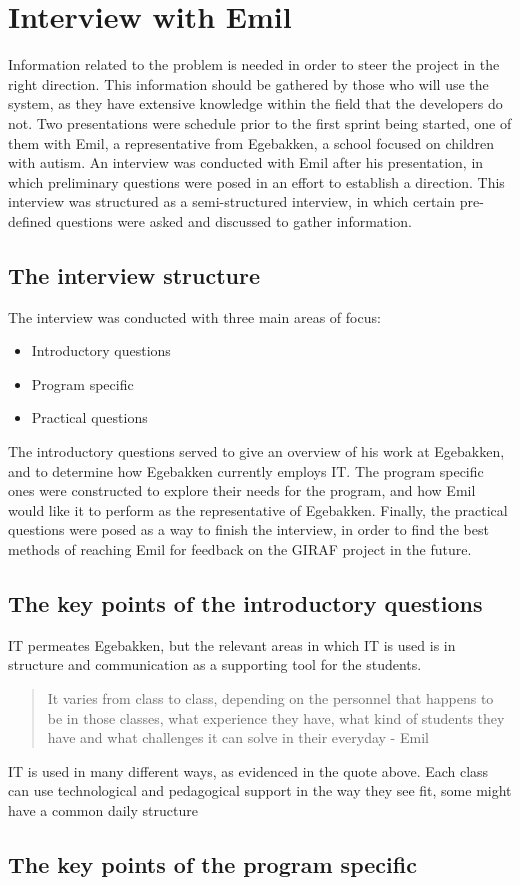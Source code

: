 \section{Interview with Emil}
Information related to the problem is needed in order to steer the project in the right direction.
This information should be gathered by those who will use the system, as they have extensive knowledge within the field that the developers do not.
Two presentations were schedule prior to the first sprint being started, one of them with Emil, a representative from Egebakken, a school focused on children with autism.
An interview was conducted with Emil after his presentation, in which preliminary questions were posed in an effort to establish a direction.
This interview was structured as a semi-structured interview, in which certain pre-defined questions were asked and discussed to gather information.

\subsection{The interview structure}
The interview was conducted with three main areas of focus:
\begin{itemize}
    \item Introductory questions
    \item Program specific
    \item Practical questions 
\end{itemize}
\noindent
The introductory questions served to give an overview of his work at Egebakken, and to determine how Egebakken currently employs IT.
The program specific ones were constructed to explore their needs for the program, and how Emil would like it to perform as the representative of Egebakken.
Finally, the practical questions were posed as a way to finish the interview, in order to find the best methods of reaching Emil for feedback on the GIRAF project in the future.

\subsection{The key points of the introductory questions}
IT permeates Egebakken, but the relevant areas in which IT is used is in structure and communication as a supporting tool for the students.

\begin{quote}
    It varies from class to class, depending on the personnel that happens to be in those classes, what experience they have, what kind of students they have and what challenges it can solve in their everyday - Emil
\end{quote}
IT is used in many different ways, as evidenced in the quote above. Each class can use technological and pedagogical support in the way they see fit, some might have a common daily structure 
\subsection{The key points of the program specific}


